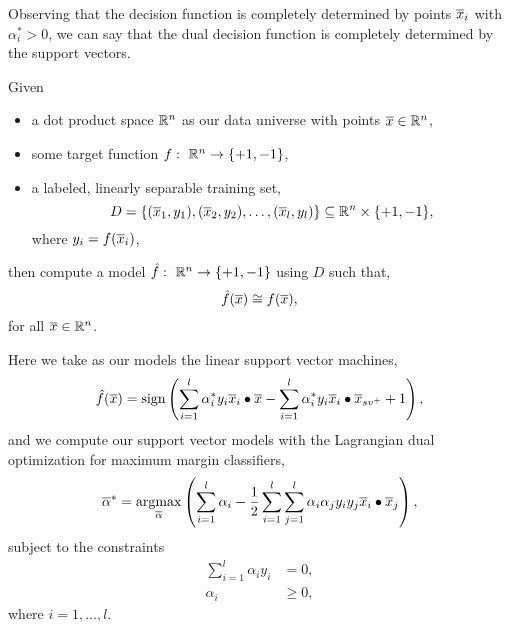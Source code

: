 \documentclass[a4paper,blends,pdf,colorBG,slideColor]{prosper}
\begin{document}
Observing that the decision function is completely determined by points $\overline{x}_i$ with
$\alpha^*_i > 0$, we can say that the dual decision function is completely determined by
the support vectors.

\begin{center}
\end{center}

\es

Given
\begin{itemize}
\item a dot product space $\mathbb{R}^{n}$ as our data universe with points $\overline{x} \in \mathbb{R}^{n}$,
\item some target function $f\,\colon\; \mathbb{R}^{n} \rightarrow \{+1,-1\}$,
\item a labeled, linearly separable training set, 
\begin{equation*}
D = \{(\overline{x}_1,y_1),(\overline{x}_2,y_2),\ldots,(\overline{x}_l,y_l)\} \subseteq \mathbb{R}^{n}\times\{+1, -1\},
\end{equation*}
where $y_i = f(\overline{x}_i)$,
\end{itemize}
then compute a model  $\hat{f}\,\colon\; \mathbb{R}^{n} \rightarrow \{+1,-1\}$ using $D$ such that,
\begin{equation*}
\hat{f}(\overline{x}) \cong f(\overline{x}),
\end{equation*}
for all $\overline{x} \in \mathbb{R}^{n}$.

\es

Here we take as our models the linear support vector machines,
\begin{equation*}
\model{f}(\ol{x}) = \sign \left ( \sum_{i=1}^l \alpha^*_i y_i \ol{x}_i\bullet\ol{x} - \sum_{i=1}^l \alpha^*_i y_i  \ol{x}_i\bullet\ol{x}_{sv^+} + 1\right ),
\end{equation*}
and we compute our support vector models with the Lagrangian dual optimization for maximum margin classifiers,
\begin{equation*}
\ol{\alpha}^* =  
  \argmax_{\ol{\alpha}} \left ( \sum_{i=1}^l \alpha_i - 
  \frac{1}{2}\sum_{i=1}^l \sum_{j=1}^l \alpha_i \alpha_j y_i y_j \ol{x}_i \bullet \ol{x}_j \right ),
\end{equation*}
subject to the constraints
\begin{align*}
\sum_{i=1}^l \alpha_i  y_i &= 0,\\
\alpha_i  &\ge 0, 
\end{align*}
where $i = 1,\ldots,l$.
\es
\end{document}
